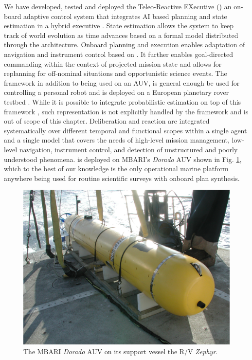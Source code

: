 We have developed, tested and deployed the Teleo-Reactive EXecutive
(\rxe) an on-board adaptive control system that integrates AI based
planning and state estimation in a hybrid executive
\cite{mcgann08a,mcgann08b,py10}.  State estimation allows the system
to keep track of world evolution as time advances based on a formal
model distributed through the architecture.  Onboard planning and
execution enables adaptation of navigation and instrument control
based on .  It further enables goal-directed
commanding within the context of projected mission state and allows
for replanning for off-nominal situations and opportunistic science
events. The framework in addition to being used on an AUV, is general
enough  be used for controlling a personal robot
\cite{pr2,Meeussen:2010dn,mcgann2009} and is deployed on a European
planetary rover testbed \cite{goac11}. While it is possible to
integrate probabilistic estimation on top of this framework
\cite{mcgann08d}, such representation is not explicitly handled by the
framework and is out of scope of this chapter.  Deliberation and
reaction are integrated systematically over different temporal and
functional scopes within a single agent and a single model that covers
the needs of high-level mission management, low-level navigation,
instrument control, and detection of unstructured and poorly
understood phenomena. \rx is deployed on MBARI's \emph{Dorado} AUV
shown in Fig. \ref{fig:auv-fig}, which to the best of our knowledge is
the only operational marine platform anywhere being used for routine
scientific surveys with onboard plan synthesis.

\begin{figure}[t]
  \centering \vskip-5pt
  \includegraphics[scale=1.2]{figs/MBARI-AUV.jpeg}
  \caption{\small The MBARI \emph{Dorado} AUV on its support vessel
    the R/V \emph{Zephyr}.}
  \label{fig:auv-fig}
  \vskip-0.3cm
\end{figure}

